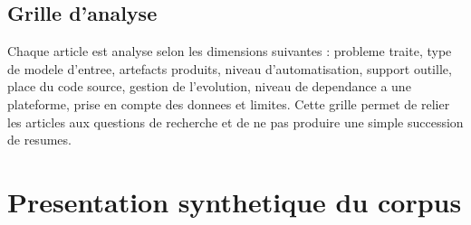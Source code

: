 \documentclass[12pt,a4paper]{article}
\begin{document}
\subsection{Grille d'analyse}

Chaque article est analyse selon les dimensions suivantes : probleme traite, type de modele d'entree, artefacts produits, niveau d'automatisation, support outille, place du code source, gestion de l'evolution, niveau de dependance a une plateforme, prise en compte des donnees et limites. Cette grille permet de relier les articles aux questions de recherche et de ne pas produire une simple succession de resumes.

\section{Presentation synthetique du corpus}
\end{document}
